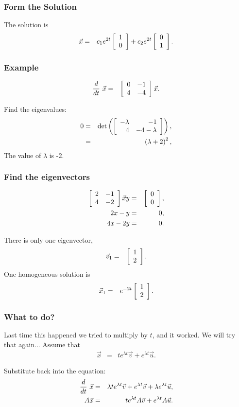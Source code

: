 \begin{frame}
  \frametitle{Form the Solution}
  The solution is
  \begin{eqnarray*}
    \vec{x} & = & c_1 e^{2t} \vecTwo{1}{0} + c_2 e^{2t} \vecTwo{0}{1}.
  \end{eqnarray*}
\end{frame}


\begin{frame}
  \frametitle{Example}

  \begin{eqnarray*}
    \deriv{~}{t} \vec{x} & = & \arrayTwo{0}{-1}{4}{-4} \vec{x}.
  \end{eqnarray*}

  {
    Find the eigenvalues:
    \begin{eqnarray*}
      0 & = & \det\lp\arrayTwo{-\lambda}{-1}{4}{-4-\lambda}\rp, \\
      & = & \lp \lambda + 2 \rp^2,
    \end{eqnarray*}
    The value of $\lambda$ is -2.
  }

\end{frame}


\begin{frame}
  \frametitle{Find the eigenvectors}

  \begin{eqnarray*}
    \arrayTwo{2}{-1}{4}{-2} \vec{x}{y} & = & \vecTwo{0}{0}, \\
    2x - y & = & 0, \\
    4x - 2y & = & 0.
  \end{eqnarray*}

  There is only one eigenvector,
  \begin{eqnarray*}
    \vec{v}_1 & = & \vecTwo{1}{2}.
  \end{eqnarray*}
  One homogeneous solution is 
  \begin{eqnarray*}
   \vec{x}_1 & = & e^{-2t}\vecTwo{1}{2}.
  \end{eqnarray*}

\end{frame}

\begin{frame}
  \frametitle{What to do?}

  Last time this happened we tried to multiply by $t$, and it
  worked. We will try that again...
  Assume that
  \begin{eqnarray*}
    \vec{x} & = & t e^{\lambda t} \vec{v} + e^{\lambda t} \vec{u}.
  \end{eqnarray*}

  {
    Substitute back into the equation:
    \begin{eqnarray*}
      \deriv{~}{t} \vec{x} & = & \lambda t e^{\lambda t} \vec{v} + e^{\lambda t} \vec{v} 
         + \lambda e^{\lambda t} \vec{u}, \\
      A\vec{x} & = & t e^{\lambda t} A \vec{v} + e^{\lambda t} A \vec{u}.
    \end{eqnarray*}
  }
  
\end{frame}


